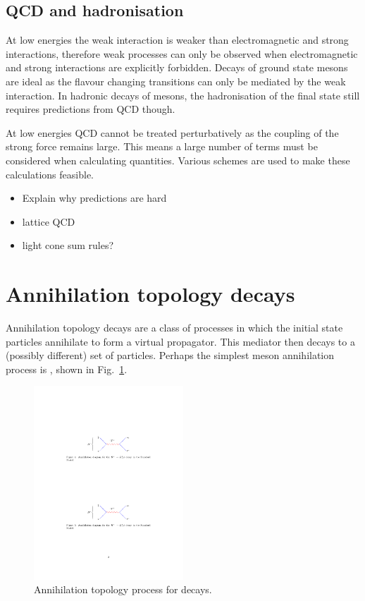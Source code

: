 \subsection{QCD and hadronisation}

At low energies the weak interaction is weaker than electromagnetic and strong interactions, therefore weak processes can only be observed when electromagnetic and strong interactions are explicitly forbidden. Decays of ground state \Bp mesons are ideal as the flavour changing transitions can only be mediated by the weak interaction. In hadronic decays of \Bp mesons, the hadronisation of the final state still requires predictions from QCD though.

At low energies QCD cannot be treated perturbatively as the coupling of the strong force remains large. This means a large number of terms must be considered when calculating quantities. 
Various schemes are used to make these calculations feasible. 
 
{\color{Red}
\begin{itemize}
\item Explain why predictions are hard
\item lattice QCD
\item light cone sum rules? 
\end{itemize}}

\section{Annihilation topology decays}

Annihilation topology decays are a class of processes in which the initial state particles annihilate to form a virtual propagator. This mediator then decays to a (possibly different) set of particles.
Perhaps the simplest \Bp meson annihilation process is \decay{\Bp}{\ellp\neul}, shown in Fig.~\ref{fig:Theory_B2ellnu}. 
\begin{figure}[!h]
    \centering
        \centering
        \includegraphics[width=0.5\textwidth]{figs/Theory/B2ellnu.pdf}
    \caption{Annihilation topology process for \decay{\Bp}{\ellp\neul} decays.}
    \label{fig:Theory_B2ellnu}   
\end{figure}

